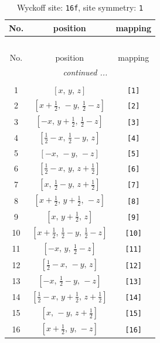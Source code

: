 \documentclass[fleqn,8pt]{jsarticle}
\begin{document}
\begin{longtable}{ccc}
\caption{Wyckoff site: {\tt 16f}, site symmetry: {\tt 1}}
 \\
 \hline \hline
No. & position & mapping \\ \hline \endfirsthead

\multicolumn{2}{l}{\tablename\ \thetable{}} \\
 \hline \hline
No. & position & mapping \\ \hline \endhead

 \hline \hline
\multicolumn{2}{r}{\footnotesize\it continued ...} \\ \endfoot

 \hline \hline
\multicolumn{2}{r}{} \\ \endlastfoot

1 & $\left[ x,\, y,\, z \right]$ & {\tt [1]} \\ \hline
2 & $\left[ x + \frac{1}{2},\, - y,\, \frac{1}{2} - z \right]$ & {\tt [2]} \\ \hline
3 & $\left[ - x,\, y + \frac{1}{2},\, \frac{1}{2} - z \right]$ & {\tt [3]} \\ \hline
4 & $\left[ \frac{1}{2} - x,\, \frac{1}{2} - y,\, z \right]$ & {\tt [4]} \\ \hline
5 & $\left[ - x,\, - y,\, - z \right]$ & {\tt [5]} \\ \hline
6 & $\left[ \frac{1}{2} - x,\, y,\, z + \frac{1}{2} \right]$ & {\tt [6]} \\ \hline
7 & $\left[ x,\, \frac{1}{2} - y,\, z + \frac{1}{2} \right]$ & {\tt [7]} \\ \hline
8 & $\left[ x + \frac{1}{2},\, y + \frac{1}{2},\, - z \right]$ & {\tt [8]} \\ \hline
9 & $\left[ x,\, y + \frac{1}{2},\, z \right]$ & {\tt [9]} \\ \hline
10 & $\left[ x + \frac{1}{2},\, \frac{1}{2} - y,\, \frac{1}{2} - z \right]$ & {\tt [10]} \\ \hline
11 & $\left[ - x,\, y,\, \frac{1}{2} - z \right]$ & {\tt [11]} \\ \hline
12 & $\left[ \frac{1}{2} - x,\, - y,\, z \right]$ & {\tt [12]} \\ \hline
13 & $\left[ - x,\, \frac{1}{2} - y,\, - z \right]$ & {\tt [13]} \\ \hline
14 & $\left[ \frac{1}{2} - x,\, y + \frac{1}{2},\, z + \frac{1}{2} \right]$ & {\tt [14]} \\ \hline
15 & $\left[ x,\, - y,\, z + \frac{1}{2} \right]$ & {\tt [15]} \\ \hline
16 & $\left[ x + \frac{1}{2},\, y,\, - z \right]$ & {\tt [16]} \\
\end{longtable}
\end{document}
